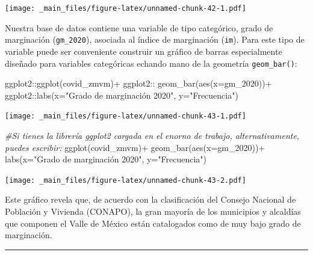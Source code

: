 \documentclass[
  11pt,
  oneside]{book}
\newenvironment{Shaded}{\begin{snugshade}}{\end{snugshade}}
\newcommand{\AttributeTok}[1]{\textcolor[rgb]{0.77,0.63,0.00}{#1}}
\newcommand{\CommentTok}[1]{\textcolor[rgb]{0.56,0.35,0.01}{\textit{#1}}}
\newcommand{\FunctionTok}[1]{\textcolor[rgb]{0.00,0.00,0.00}{#1}}
\newcommand{\NormalTok}[1]{#1}
\newcommand{\SpecialCharTok}[1]{\textcolor[rgb]{0.00,0.00,0.00}{#1}}
\newcommand{\StringTok}[1]{\textcolor[rgb]{0.31,0.60,0.02}{#1}}
\begin{document}
\texttt{[image: \_main\_files/figure-latex/unnamed-chunk-42-1.pdf]}

Nuestra base de datos contiene una variable de tipo categórico, grado de marginación (\texttt{gm\_2020}), asociada al índice de marginación (\texttt{im}). Para este tipo de variable puede ser conveniente construir un gráfico de barras especialmente diseñado para variables categóricas echando mano de la geometría \texttt{geom\_bar()}:

\begin{Shaded}
\begin{Highlighting}[]
\NormalTok{ggplot2}\SpecialCharTok{::}\FunctionTok{ggplot}\NormalTok{(covid\_zmvm)}\SpecialCharTok{+}
\NormalTok{ ggplot2}\SpecialCharTok{::} \FunctionTok{geom\_bar}\NormalTok{(}\FunctionTok{aes}\NormalTok{(}\AttributeTok{x=}\NormalTok{gm\_2020))}\SpecialCharTok{+}
\NormalTok{  ggplot2}\SpecialCharTok{::}\FunctionTok{labs}\NormalTok{(}\AttributeTok{x=}\StringTok{"Grado de marginación 2020"}\NormalTok{, }\AttributeTok{y=}\StringTok{"Frecuencia"}\NormalTok{)}
\end{Highlighting}
\end{Shaded}

\texttt{[image: \_main\_files/figure-latex/unnamed-chunk-43-1.pdf]}

\begin{Shaded}
\begin{Highlighting}[]
\CommentTok{\#Si tienes la librería ggplot2 cargada en el enorno de trabajo, alternativamente, puedes escribir:}
\FunctionTok{ggplot}\NormalTok{(covid\_zmvm)}\SpecialCharTok{+}
 \FunctionTok{geom\_bar}\NormalTok{(}\FunctionTok{aes}\NormalTok{(}\AttributeTok{x=}\NormalTok{gm\_2020))}\SpecialCharTok{+}
  \FunctionTok{labs}\NormalTok{(}\AttributeTok{x=}\StringTok{"Grado de marginación 2020"}\NormalTok{, }\AttributeTok{y=}\StringTok{"Frecuencia"}\NormalTok{)}
\end{Highlighting}
\end{Shaded}

\texttt{[image: \_main\_files/figure-latex/unnamed-chunk-43-2.pdf]}

Este gráfico revela que, de acuerdo con la clasificación del Consejo Nacional de Población y Vivienda (CONAPO), la gran mayoría de los municipios y alcaldías que componen el Valle de México están catalogados como de muy bajo grado de marginación.

\begin{center}\rule{0.5\linewidth}{0.5pt}\end{center}
\end{document}
